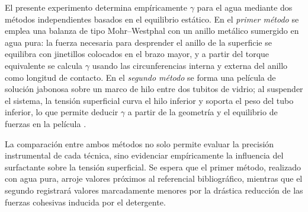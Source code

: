 El presente experimento determina empíricamente $\gamma$ para el agua mediante dos métodos
independientes basados en el equilibrio estático. En el \textit{primer método} se emplea
una balanza de tipo Mohr--Westphal con un anillo metálico sumergido en agua pura:
la fuerza necesaria para desprender el anillo de la superficie se equilibra con
jinetillos colocados en el brazo mayor, y a partir del torque equivalente se calcula
$\gamma$ usando las circunferencias interna y externa del anillo como longitud de contacto.
En el \textit{segundo método} se forma una película de solución jabonosa sobre un marco de
hilo entre dos tubitos de vidrio; al suspender el sistema, la tensión superficial curva
el hilo inferior y soporta el peso del tubo inferior, lo que permite deducir
$\gamma$ a partir de la geometría y el equilibrio de fuerzas en la película \cite{halliday}.

La comparación entre ambos métodos no solo permite evaluar la precisión instrumental de
cada técnica, sino evidenciar empíricamente la influencia del surfactante
sobre la tensión superficial. Se espera que el primer método, realizado con agua pura,
arroje valores próximos al referencial bibliográfico, mientras que el segundo
registrará valores marcadamente menores por la drástica reducción de las fuerzas
cohesivas inducida por el detergente.